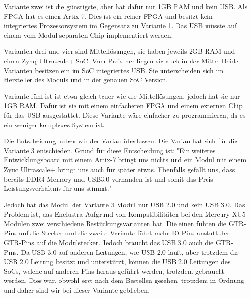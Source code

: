     Variante zwei ist die günstigste, aber hat dafür nur 1GB RAM und kein USB. Als FPGA hat es einen Artix-7. Dies ist ein reiner FPGA und besitzt kein integriertes Prozessorsystem im Gegensatz zu Variante 1. Das USB müsste auf einem vom Modul separaten Chip implementiert werden. 
    
    Varianten drei und vier sind Mittellösungen, sie haben jeweils 2GB RAM und einen Zynq Ultrascale+ SoC. Vom Preis her liegen sie auch in der Mitte. Beide Varianten besitzen ein im SoC integriertes USB. Sie unterscheiden sich im Hersteller des Moduls und in der genauen SoC Version.
    
    Variante fünf ist ist etwa gleich teuer wie die Mittellösungen, jedoch hat sie nur 1GB RAM. Dafür ist sie mit einem einfacheren FPGA und einem externen Chip für das USB ausgestattet. Diese Variante wäre einfacher zu programmieren, da es ein weniger komplexes System ist.

    Die Entscheidung haben wir der Varian überlassen. Die Varian hat sich für die Variante 3 entschieden. Grund für diese Entscheidung ist: "Ein weiteres Entwicklungsboard mit einem Artix-7 bringt uns nichts und ein Modul mit einem Zync Ultrascale+ bringt uns auch für später etwas. Ebenfalls gefällt uns, dass bereits DDR4 Memory und USB3.0 vorhanden ist und somit das Preis-Leistungsverhältnis für uns stimmt."

    Jedoch hat das Modul der Variante 3 Modul nur USB 2.0 und kein USB 3.0. Das Problem ist, das Enclustra Aufgrund von Kompatibilitäten bei den Mercury XU5 Modulen zwei verschiedene Bestückungsvarianten hat. Die einen führen die GTR-Pins auf die Stecker und die zweite Variante führt mehr IO-Pins anstatt der GTR-Pins auf die Modulstecker. Jedoch braucht das USB 3.0 auch die GTR-Pins. Da USB 3.0 auf anderen Leitungen, wie USB 2.0 läuft, aber trotzdem die USB 2.0 Leitung besitzt und unterstützt, können die USB 2.0 Leitungen des SoCs, welche auf anderen Pins heraus geführt werden, trotzdem gebraucht werden. Dies war, obwohl erst nach dem Bestellen gesehen, trotzdem in Ordnung und daher sind wir bei dieser Variante geblieben.
    
